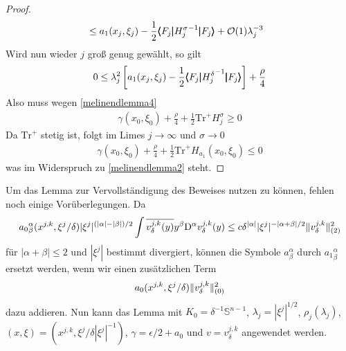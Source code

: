 \begin{proof}
\begin{align*}
&\le a_1(x_j,\xi_j) - \frac 1 2\pmb\langle F_j\pmb|{H_j^\sigma}^{-1}\pmb|F_j\pmb\rangle  + \mathcal O(1)\lambda_j^{-3}
\end{align*}
Wird nun wieder $j$ groß genug gewählt, so gilt
\begin{align*}
0\le \lambda_j^2\left[ a_1(x_j,\xi_j) - \frac{1}{2}\pmb\langle F_j\pmb|{H_j^\delta}^{-1}\pmb|F_j\pmb\rangle \right]  +\frac\rho 4
\end{align*}
Also muss wegen \eqref{melinendlemma4}
\begin{align*}
\gamma(x_0,\xi_0) + \frac \rho 4 + \frac 1 2 \mathrm{Tr}^+ H_j^\sigma\ge 0
\end{align*}
Da $\mathrm{Tr}^+$ stetig ist, folgt im Limes $j\to\infty$ und $\sigma\to 0$
\begin{align*}
\gamma(x_0,\xi_0) + \frac \rho 4 + \frac 1 2 \mathrm{Tr}^+ H_{a_1}(x_0,\xi_0)\le 0
\end{align*}
was im Widerspruch zu \eqref{melinendlemma2} steht.
\end{proof}

Um das Lemma zur Vervollständigung des Beweises nutzen zu können, fehlen noch einige Vorüberlegungen. Da
\begin{align*}
{a_0}^\alpha_\beta(x^{j,k},\xi^j/\delta)|\xi^j|^{(|\alpha|-|\beta|)/2}\int \overline{v^{j,k}_\delta(y)}y^\beta\mathrm D^\alpha v^{j,k}_\delta(y) \le c \delta^{\lvert\alpha\rvert}|\xi^j|^{-|\alpha+\beta|/2}\lVert v^{j,k}_\delta\rVert_{(2)}^2
\end{align*}
für $|\alpha+\beta|\le 2$ und $|\xi^j|$ bestimmt divergiert, können die Symbole $a^\alpha_\beta$ durch ${a_1}^\alpha_\beta$ ersetzt werden, wenn wir einen zusätzlichen Term
\begin{align*}
{a_0}(x^{j,k},\xi^j/\delta)\lVert v^{j,k}_\delta\rVert_{(0)}^2
\end{align*}
dazu addieren. Nun kann das Lemma mit $K_0=\delta^{-1}\mathbb{S}^{n-1}$, $\lambda_j=|\xi^j|^{1/2}$, $\rho_j(\lambda_j)$, $(x,\xi)=(x^{j,k},\xi^j/\delta|\xi^j|^{-1})$, $\gamma = \epsilon/2 + a_0$ und $v=v^{j,k}_\delta$ angewendet werden.
